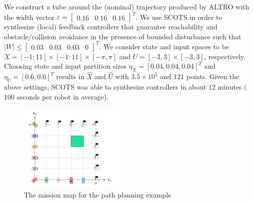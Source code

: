 We construct a tube around the (nominal) trajectory produced by ALTRO with the width vector $\varepsilon=\begin{bmatrix}0.16&0.16&0.16\end{bmatrix}^T$.
 We use SCOTS in order to synthesize (local) feedback controllers that guarantee reachability and obstacle/collision avoidance in the presence of bounded disturbance such that $|W|\leq \begin{bmatrix}0.03&0.03&0.03&0\end{bmatrix}^T$. We consider state and input spaces to be $X=[-1:11]\times[-1:11]\times[-\pi,\pi]$ and
$U=[-3,3]\times[-3,3]$, respectively. Choosing state and input partition sizes $\eta_{X}=[0.04,0.04,0.04]^T$ and
$\eta_{U}=[0.6,0.6]^T$ results in $\hat X$ and $\hat U$ with $3.5\times 10^5$ and $121$ points.  %
Given the above settings, SCOTS was able to synthesize controllers in about $12$ minutes ($100$ seconds per robot in average). 

\begin{figure}[t]
	\centering
	\includegraphics[width=0.45\textwidth]{figures/MA1.png}
	\caption{The mission map for the path planning example}
\end{figure}\label{fig:MA}


